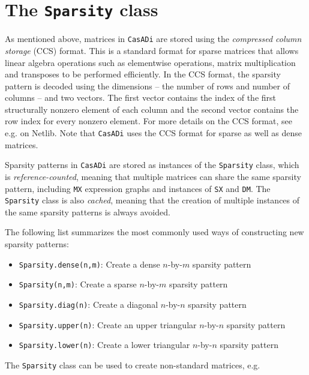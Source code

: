 \documentclass[a4paper,12pt]{book}
\newcommand{\CasADi}{\texttt{CasADi}\xspace}
\begin{document}
\section{The \texttt{Sparsity} class} \label{sec:sparsity_class}
As mentioned above, matrices in \CasADi are stored using the \emph{compressed column storage} (CCS) format. This is a standard format for sparse matrices that allows linear algebra operations such as elementwise operations, matrix multiplication and transposes to be performed efficiently. In the CCS format, the sparsity pattern is decoded using the dimensions -- the number of rows and number of columns -- and two vectors. The first vector contains the index of the first structurally nonzero element of each column and the second vector contains the row index for every nonzero element. For more details on the CCS format, see e.g.  on Netlib. Note that \CasADi uses the CCS format for sparse as well as dense matrices.

Sparsity patterns in \CasADi are stored as instances of the \texttt{Sparsity} class, which is \emph{reference-counted}, meaning that multiple matrices can share the same sparsity pattern, including \texttt{MX} expression graphs and instances of \texttt{SX} and \texttt{DM}. The \texttt{Sparsity} class is also \emph{cached}, meaning that the creation of multiple instances of the same sparsity patterns is always avoided.

The following list summarizes the most commonly used ways of constructing new sparsity patterns:
\begin{itemize}
  \item \lstinline[language=Python]{Sparsity.dense(n,m)}: Create a dense $n$-by-$m$ sparsity pattern
  \item \lstinline[language=Python]{Sparsity(n,m)}: Create a sparse $n$-by-$m$ sparsity pattern
  \item \lstinline[language=Python]{Sparsity.diag(n)}: Create a diagonal $n$-by-$n$ sparsity pattern
  \item \lstinline[language=Python]{Sparsity.upper(n)}: Create an upper triangular $n$-by-$n$ sparsity pattern
  \item \lstinline[language=Python]{Sparsity.lower(n)}: Create a lower triangular $n$-by-$n$ sparsity pattern
\end{itemize}

The \texttt{Sparsity} class can be used to create non-standard matrices, e.g.
\end{document}
